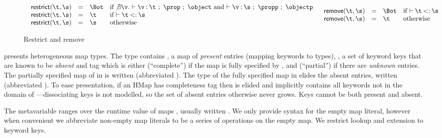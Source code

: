 \begin{figure}
  \footnotesize
$$
\begin{array}{lr}
  \begin{array}{llll}
    \restrictfigure{}
  \end{array}
  \ \ 
  \begin{array}{llll}
    \removefigure{}
  \end{array}
\end{array}
$$
\caption{Restrict and remove}
\label{main:figure:restrictremove}
\end{figure}

presents
heterogeneous map types.
The type \HMapgeneric{\mandatory{}}{\absent{}}
contains {\mandatory{}}, a map of \emph{present} entries (mapping keywords to types),
\absent{}, a set of keyword keys that are known to be \emph{absent}
and
tag \completenessmeta{} which is either {\complete{}} (``complete'') if the map is fully specified by \mandatory{},
and {\partial{}} (``partial'') if there are \emph{unknown} entries.
%
The partially specified map of
 in 
is written
(abbreviated \Lunch).
%
The type of the fully specified map
 in  elides the absent entries,
written
(abbreviated \Breakfast).
To ease presentation, 
if an HMap has completeness tag \complete{} then \absent{} is elided and implicitly contains all keywords not in the domain of 
\mandatory{}---dissociating keys is not modelled, so the set of absent entries otherwise
never grows.
Keys cannot be both present and absent.

The metavariable \mapval{}
ranges over the runtime value of maps {\curlymapvaloverright{\k{}}{\v{}}},
usually written {\curlymapvaloverrightnoarrow{\k{}}{\v{}}}.
We %
only provide syntax for the empty map literal,
however when convenient we abbreviate non-empty map literals
to be a series of \assocliteral{} operations on the empty map.
We restrict lookup and extension to keyword keys. 

